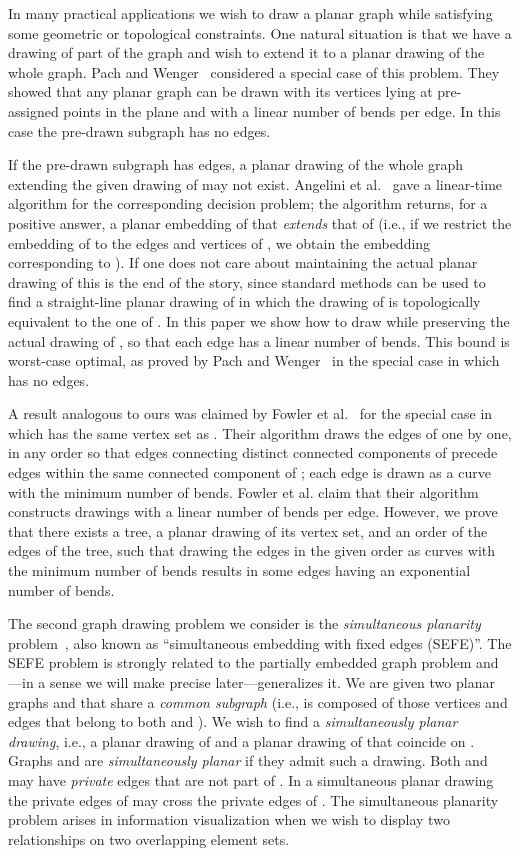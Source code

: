 \documentclass{llncs}
\begin{document}
In many practical applications we wish to draw a planar graph while satisfying some geometric or topological constraints. One natural situation is that we have a drawing of part of the graph and wish to extend it to a planar drawing of the whole graph. Pach and Wenger~\cite{PW01} considered a special case of this problem.  They showed that any planar graph can be drawn with its vertices lying at pre-assigned points in the plane and with a linear number of bends per edge. In this case the pre-drawn subgraph has no edges.

If the pre-drawn subgraph  has edges, a planar drawing of the whole graph  extending the given drawing  of  may not exist. Angelini et al.~\cite{ABFJKPR10} gave a linear-time algorithm for the corresponding decision problem; the algorithm returns, for a positive answer, a planar embedding of  that {\em extends} that of  (i.e., if we restrict the embedding of  to the edges and vertices of , we obtain the embedding corresponding to ). If one does not care about maintaining the actual planar drawing of  this is the end of the story, since standard methods can be used to find a straight-line planar drawing of  in which the drawing of  is topologically equivalent to the one of . In this paper we show how to draw  while preserving the actual drawing  of , so that each edge has a linear number of bends. This bound is worst-case optimal, as proved by Pach and Wenger~\cite{PW01} in the special case in which  has no edges.

A result analogous to ours was claimed by Fowler et al.~\cite{fjks-crp-11} for the special case in which  has the same vertex set as . Their algorithm draws the edges of  one by one, in any order so that edges connecting distinct connected components of  precede edges within the same connected component of ; each edge is drawn as a curve with the minimum number of bends. Fowler et al. claim that their algorithm constructs drawings with a linear number of bends per edge. However, we prove that there exists a tree, a planar drawing of its vertex set, and an order of the edges of the tree, such that drawing the edges in the given order as curves with the minimum number of bends results in some edges having an exponential number of bends.

The second graph drawing problem we consider is the \emph{simultaneous planarity} problem~\cite{BKR?}, also known as ``simultaneous embedding with fixed edges (SEFE)''.  The SEFE problem is strongly related to the partially embedded graph problem and---in a sense we will make precise later---generalizes it. We are given two planar graphs  and  that share a \emph{common subgraph}  (i.e.,  is composed of those vertices and edges that belong to both  and ). We wish to find a \emph{simultaneously planar drawing}, i.e., a planar drawing of  and a planar drawing of  that coincide on . Graphs  and  are \emph{simultaneously planar} if they admit such a drawing. Both  and  may have {\em private} edges that are not part of . In a simultaneous planar drawing the private edges of  may cross the private edges of . The simultaneous planarity problem arises in information visualization when we wish to display two relationships on two overlapping element sets.
\end{document}
